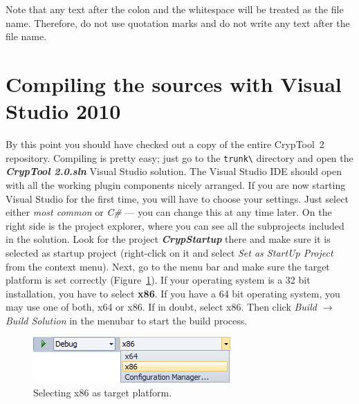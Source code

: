\begin{center}
\end{center}

Note that any text after the colon and the whitespace will be treated as the file name. Therefore, do not use quotation marks and do not write any text after the file name.

\section{Compiling the sources with Visual Studio 2010}
\label{CompilingTheSourcesVS}

By this point you should have checked out a copy of the entire CrypTool~2 repository. Compiling is pretty easy; just go to the \texttt{trunk\textbackslash} directory and open the \textbf{\textit{CrypTool 2.0.sln}} Visual Studio solution. The Visual Studio IDE should open with all the working plugin components nicely arranged. If you are now starting Visual Studio for the first time, you will have to choose your settings. Just select either \textit{most common} or \textit{C\#} --- you can change this at any time later. On the right side is the project explorer, where you can see all the subprojects included in the solution. Look for the project \textbf{\textit{CrypStartup}} there and make sure it is selected as startup project (right-click on it and select \textit{Set as StartUp Project} from the context menu). Next, go to the menu bar and make sure the target platform is set correctly (Figure~\ref{fig:vs_menubar_x86}). If your operating system is a 32 bit installation, you have to select \textbf{x86}. If you have a 64 bit operating system, you may use one of both, x64 or x86. If in doubt, select x86. Then click \textit{Build $\rightarrow$ Build Solution} in the menubar to start the build process.

\begin{figure}[htbp]
	\centering
		\includegraphics{figures/vs_menubar_x86.png}
	\caption{Selecting x86 as target platform.}
	\label{fig:vs_menubar_x86}
\end{figure}
\clearpage

